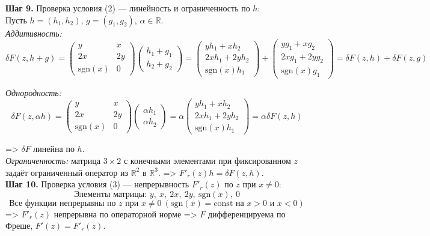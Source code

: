 \documentclass[a4paper, 12pt]{article}
\begin{document}
\textbf{Шаг 9.} Проверка условия (2) — линейность и ограниченность по $h$:\\

Пусть $h = (h_1, h_2)$, $g = (g_1, g_2)$, $\alpha \in \mathbb{R}$.\\

\textit{Аддитивность:}
\[
\delta F(z, h + g) = 
\begin{pmatrix}
y & x \\
2x & 2y \\
\text{sgn}(x) & 0
\end{pmatrix}
\begin{pmatrix}
h_1 + g_1 \\
h_2 + g_2
\end{pmatrix}
=
\begin{pmatrix}
y h_1 + x h_2 \\
2x h_1 + 2y h_2 \\
\text{sgn}(x) h_1
\end{pmatrix}
+
\begin{pmatrix}
y g_1 + x g_2 \\
2x g_1 + 2y g_2 \\
\text{sgn}(x) g_1
\end{pmatrix}
= \delta F(z, h) + \delta F(z, g)
\]

\textit{Однородность:}
\[
\delta F(z, \alpha h) = 
\begin{pmatrix}
y & x \\
2x & 2y \\
\text{sgn}(x) & 0
\end{pmatrix}
\begin{pmatrix}
\alpha h_1 \\
\alpha h_2
\end{pmatrix}
= \alpha
\begin{pmatrix}
y h_1 + x h_2 \\
2x h_1 + 2y h_2 \\
\text{sgn}(x) h_1
\end{pmatrix}
= \alpha \delta F(z, h)
\]

=> $\delta F$ линейна по $h$.\\

\textit{Ограниченность:} матрица $3 \times 2$ с конечными элементами при фиксированном $z$ задаёт ограниченный оператор из $\mathbb{R}^2$ в $\mathbb{R}^3$.
=> $F'_r(z) h = \delta F(z, h)$.\\

\textbf{Шаг 10.} Проверка условия (3) — непрерывность $F'_r(z)$ по $z$ при $x \neq 0$:
\[
\text{Элементы матрицы: } y, \ x, \ 2x, \ 2y, \ \text{sgn}(x), \ 0
\]
\[
\text{Все функции непрерывны по } z \text{ при } x \neq 0 \ (\text{sgn}(x) = \text{const на } x > 0 \text{ и } x < 0)
\]
=> $F'_r(z)$ непрерывна по операторной норме
=> $F$ дифференцируема по Фреше, $F'(z) = F'_r(z)$.\\
\end{document}

